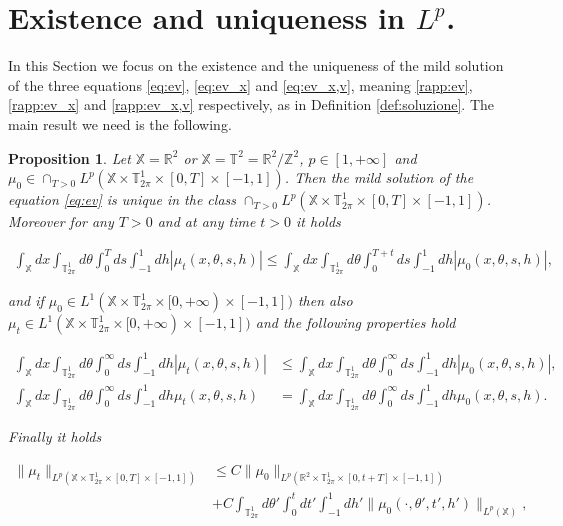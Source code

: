 \documentclass[a4paper,10pt,reqno]{amsart}
\newtheorem{proposition}{Proposition}[section]
\numberwithin{equation}{subsection}
\numberwithin{figure}{subsection}
\begin{document}
\section{Existence and uniqueness in $L^p$.}\label{app:es/un}
In this Section we focus on the existence and the uniqueness of the mild solution of the three equations \eqref{eq:ev}, \eqref{eq:ev_x} and \eqref{eq:ev_x,v}, meaning \eqref{rapp:ev}, \eqref{rapp:ev_x} and \eqref{rapp:ev_x,v} respectively, as in Definition \ref{def:soluzione}. The main result we need is the following.
\begin{proposition}\label{prop:es/un} Let $\mathbb{X}=\mathbb{R}^2$ or $\mathbb{X}=\mathbb{T}^2=\mathbb{R}^2/\mathbb{Z}^2$, $p\in[1,+\infty]$ and $\mu_0\in \cap_{T>0}L^p(\mathbb{X}\times\mathbb{T}^1_{2\pi}\times[0,T]\times[-1,1])$. Then the mild solution of the equation \eqref{eq:ev} is unique in the class $\cap_{T>0}L^p(\mathbb{X}\times\mathbb{T}^1_{2\pi}\times[0,T]\times[-1,1])$. Moreover for any $T>0$ and at any time $t>0$ it holds

{\small\begin{align}\label{mutL1cpt}
\int_{\mathbb{X}}dx\int_{\mathbb{T}^1_{2\pi}}d\theta\int_0^Tds\int_{-1}^1dh|\mu_t(x,\theta,s,h)|\leq\int_{\mathbb{X}}dx\int_{\mathbb{T}^1_{2\pi}}d\theta\int_0^{T+t}ds\int_{-1}^1dh|\mu_0(x,\theta,s,h)|,
\end{align}}

and if $\mu_0\in L^1(\mathbb{X}\times\mathbb{T}^1_{2\pi}\times[0,+\infty)\times[-1,1])$ then also $\mu_t\in L^1(\mathbb{X}\times\mathbb{T}^1_{2\pi}\times[0,+\infty)\times[-1,1])$ and the following properties hold

{\small\begin{align}
\label{distanzadecr}\int_{\mathbb{X}}dx\int_{\mathbb{T}^1_{2\pi}}d\theta\int_0^{\infty}ds\int_{-1}^1dh|\mu_t(x,\theta,s,h)|&\leq\int_{\mathbb{X}}dx\int_{\mathbb{T}^1_{2\pi}}d\theta\int_0^{\infty}ds\int_{-1}^1dh|\mu_0(x,\theta,s,h)|,
\\
\label{consmassa}\int_{\mathbb{X}}dx\int_{\mathbb{T}^1_{2\pi}}d\theta\int_0^{\infty}ds\int_{-1}^1dh\mu_t(x,\theta,s,h)&=\int_{\mathbb{X}}dx\int_{\mathbb{T}^1_{2\pi}}d\theta\int_0^{\infty}ds\int_{-1}^1dh\mu_0(x,\theta,s,h).
\end{align}}

Finally it holds

\begin{align}
\nonumber\|\mu_t\|_{L^p(\mathbb{X}\times\mathbb{T}^1_{2\pi}\times[0,T]\times[-1,1])}&\leq C\|\mu_0\|_{L^p(\mathbb{R}^2\times\mathbb{T}^1_{2\pi}\times[0,t+T]\times[-1,1])}
\\
\label{normaLp}&+C\int_{\mathbb{T}^1_{2\pi}}d\theta'\int_0^tdt'\int_{-1}^1dh'\|\mu_0(\cdot,\theta',t',h')\|_{L^p(\mathbb{X})},
\end{align}


\end{proposition}
\end{document}
